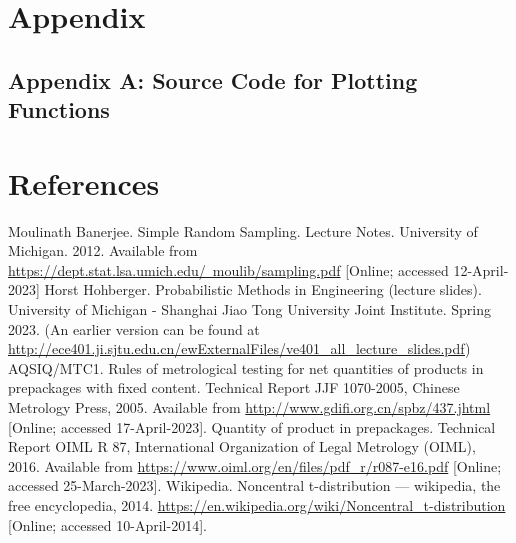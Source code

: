 \documentclass[12pt]{article}
\begin{document}
\newpage
\section{Appendix}

\subsection{Appendix A: Source Code for Plotting Functions}
\label{mmacode}

\newpage
    \section{References}
    \begingroup  %
    \renewcommand{\section}[2]{} 
    \begin{thebibliography}{99}
         Moulinath Banerjee. Simple Random Sampling. Lecture Notes. University of Michigan. 2012. Available from \href{https://dept.stat.lsa.umich.edu/~moulib/sampling.pdf}{https://dept.stat.lsa.umich.edu/~moulib/sampling.pdf} [Online; accessed 12-April-2023]
         Horst Hohberger. Probabilistic Methods in Engineering (lecture slides). University of Michigan - Shanghai Jiao Tong University Joint Institute. Spring 2023. (An earlier version can be found at \href{http://ece401.ji.sjtu.edu.cn/ewExternalFiles/ve401\_all\_lecture\_slides.pdf}{http://ece401.ji.sjtu.edu.cn/ewExternalFiles/ve401\_all\_lecture\_slides.pdf})
         AQSIQ/MTC1. Rules of metrological testing for net quantities of products in prepackages with fixed content. Technical Report JJF 1070-2005, Chinese Metrology Press, 2005. Available from \href{http://www.gdifi.org.cn/spbz/437.jhtml}{http://www.gdifi.org.cn/spbz/437.jhtml} [Online; accessed 17-April-2023].
		 Quantity of product in prepackages. Technical Report OIML R 87, International Organization of Legal Metrology (OIML), 2016. Available from \href{https://www.oiml.org/en/files/pdf\_r/r087-e16.pdf}{https://www.oiml.org/en/files/pdf\_r/r087-e16.pdf} [Online; accessed 25-March-2023].
         Wikipedia. Noncentral t-distribution — wikipedia, the free encyclopedia, 2014. \href{https://en.wikipedia.org/wiki/Noncentral\_t-distribution}{https://en.wikipedia.org/wiki/Noncentral\_t-distribution} [Online; accessed 10-April-2014].
    \end{thebibliography}
    \endgroup
\end{document}
